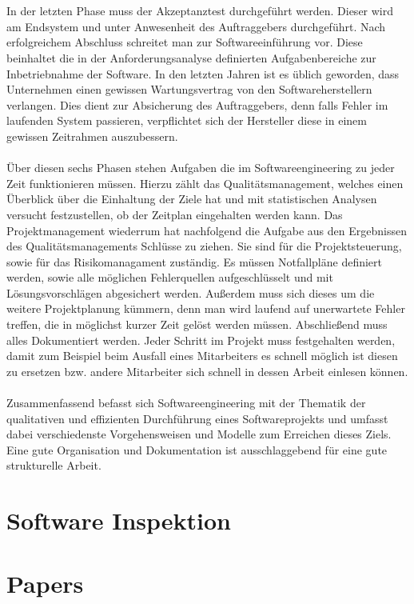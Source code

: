 \documentclass{llncs}
\begin{document}
\\ \\
In der letzten Phase muss der Akzeptanztest durchgeführt werden. Dieser wird am Endsystem und unter Anwesenheit des Auftraggebers durchgeführt. Nach erfolgreichem Abschluss schreitet man zur Softwareeinführung vor. Diese beinhaltet die in der Anforderungsanalyse definierten Aufgabenbereiche zur Inbetriebnahme der Software. In den letzten Jahren ist es üblich geworden, dass Unternehmen einen gewissen Wartungsvertrag von den Softwareherstellern verlangen. Dies dient zur Absicherung des Auftraggebers, denn falls Fehler im laufenden System passieren, verpflichtet sich der Hersteller diese in einem gewissen Zeitrahmen auszubessern. 
\\ \\
Über diesen sechs Phasen stehen Aufgaben die im Softwareengineering zu jeder Zeit funktionieren müssen. Hierzu zählt das Qualitätsmanagement, welches einen Überblick über die Einhaltung der Ziele hat und mit statistischen Analysen versucht festzustellen, ob der Zeitplan eingehalten werden kann. Das Projektmanagement wiederrum hat nachfolgend die Aufgabe aus den Ergebnissen des Qualitätsmanagements Schlüsse zu ziehen. Sie sind für die Projektsteuerung, sowie für das Risikomanagament zuständig. Es müssen Notfallpläne definiert werden, sowie alle möglichen Fehlerquellen aufgeschlüsselt und mit Lösungsvorschlägen abgesichert werden. Außerdem muss sich dieses um die weitere Projektplanung kümmern, denn man wird laufend auf unerwartete Fehler treffen, die in möglichst kurzer Zeit gelöst werden müssen. Abschließend muss alles Dokumentiert werden. Jeder Schritt im Projekt muss festgehalten werden, damit zum Beispiel beim Ausfall eines Mitarbeiters es schnell möglich ist diesen zu ersetzen bzw. andere Mitarbeiter sich schnell in dessen Arbeit einlesen können.
\\ \\
Zusammenfassend befasst sich Softwareengineering mit der Thematik der qualitativen und effizienten Durchführung eines Softwareprojekts und umfasst dabei verschiedenste Vorgehensweisen und Modelle zum Erreichen dieses Ziels. Eine gute Organisation und Dokumentation ist ausschlaggebend für eine gute strukturelle Arbeit.


\section{Software Inspektion}

\section{Papers}
\end{document}

